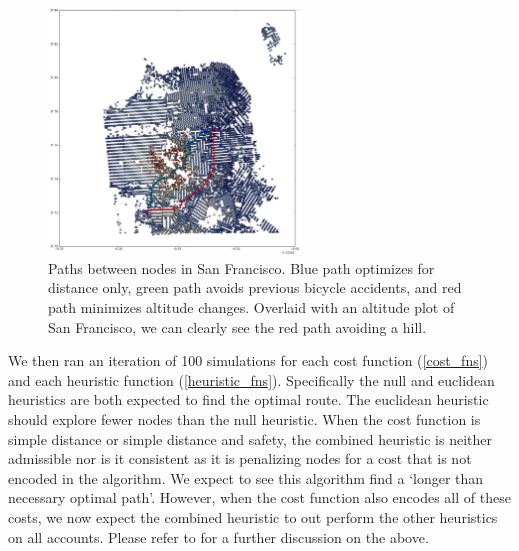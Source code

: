 \documentclass[11pt]{article}
\begin{document}
\begin{figure}
\label{connected_san_fran}
\center
\caption{Paths between nodes in San Francisco. Blue path optimizes for distance only, green path avoids previous bicycle accidents, and red path minimizes altitude changes. Overlaid with an altitude plot of San Francisco, we can clearly see the red path avoiding a hill.}
\includegraphics[width=0.6\textwidth]{sf_new_plot_2.png}
\end{figure}

\par
We then ran an iteration of 100 simulations for each cost function (\ref{cost_fns}) and each heuristic function (\ref{heuristic_fns}). Specifically the null and euclidean heuristics are both expected to find the optimal route. The euclidean heuristic should explore fewer nodes than the null heuristic. When the cost function is simple distance or simple distance and safety, the combined heuristic is neither admissible nor is it consistent as it is penalizing nodes for a cost that is not encoded in the algorithm. We expect to see this algorithm find a `longer than necessary optimal path'. However, when the cost function also encodes all of these costs, we now expect the combined heuristic to out perform the other heuristics on all accounts. Please refer to  for a further discussion on the above.


\end{document}

